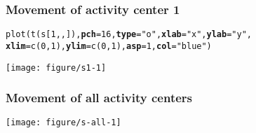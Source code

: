 \documentclass[color=usenames,dvipsnames]{beamer}\usepackage[]{graphicx}\usepackage[]{color}
\makeatletter
\newcommand{\hlnum}[1]{\textcolor[rgb]{0.69,0.494,0}{#1}}%
\newcommand{\hlstr}[1]{\textcolor[rgb]{0.749,0.012,0.012}{#1}}%
\newcommand{\hlstd}[1]{\textcolor[rgb]{0,0,0}{#1}}%
\newcommand{\hlkwc}[1]{\textcolor[rgb]{0,0,0}{\textbf{#1}}}%
\newcommand{\hlkwd}[1]{\textcolor[rgb]{0.004,0.004,0.506}{#1}}%
\newenvironment{kframe}{%
 \def\at@end@of@kframe{}%
 \ifinner\ifhmode%
  \def\at@end@of@kframe{\end{minipage}}%
  \begin{minipage}{\columnwidth}%
 \fi\fi%
 \def\FrameCommand##1{\hskip\@totalleftmargin \hskip-\fboxsep
 \colorbox{shadecolor}{##1}\hskip-\fboxsep
     \hskip-\linewidth \hskip-\@totalleftmargin \hskip\columnwidth}%
 \MakeFramed {\advance\hsize-\width
   \@totalleftmargin\z@ \linewidth\hsize
   \@setminipage}}%
 {\par\unskip\endMakeFramed%
 \at@end@of@kframe}
\newenvironment{knitrout}{}{} %
\makeatother
\begin{document}
\begin{frame}[fragile]
  \frametitle{Movement of activity center 1}
\begin{knitrout}\scriptsize
{}\color{fgcolor}\begin{kframe}
\begin{alltt}
\hlkwd{plot}\hlstd{(}\hlkwd{t}\hlstd{(s[}\hlnum{1}\hlstd{,,]),} \hlkwc{pch}\hlstd{=}\hlnum{16}\hlstd{,} \hlkwc{type}\hlstd{=}\hlstr{"o"}\hlstd{,} \hlkwc{xlab}\hlstd{=}\hlstr{"x"}\hlstd{,} \hlkwc{ylab}\hlstd{=}\hlstr{"y"}\hlstd{,}
     \hlkwc{xlim}\hlstd{=}\hlkwd{c}\hlstd{(}\hlnum{0}\hlstd{,} \hlnum{1}\hlstd{),} \hlkwc{ylim}\hlstd{=}\hlkwd{c}\hlstd{(}\hlnum{0}\hlstd{,} \hlnum{1}\hlstd{),} \hlkwc{asp}\hlstd{=}\hlnum{1}\hlstd{,} \hlkwc{col}\hlstd{=}\hlstr{"blue"}\hlstd{)}
\end{alltt}
\end{kframe}

{\centering \texttt{[image: figure/s1-1]} 

}


\end{knitrout}
\end{frame}





\begin{frame}[fragile]
  \frametitle{Movement of all activity centers}
\begin{knitrout}\scriptsize
{}\color{fgcolor}

{\centering \texttt{[image: figure/s-all-1]} 

}


\end{knitrout}
\end{frame}
\end{document}
